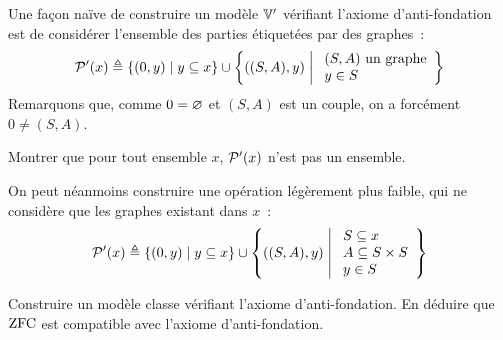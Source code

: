 \begin{problem}
  Une façon naïve de construire un modèle $\mathbb V'$ vérifiant l'axiome
  d'anti-fondation est de considérer l'ensemble des parties étiquetées par des
  graphes~:
  \[\mathcal{P}'(x) \triangleq \left\{ (0,y) \;\middle\vert\; y\subseteq x \right\}\cup
  \left\{ ((S,A),y) \;\middle\vert\; \begin{array}{l} (S,A)\text{ un graphe} \\ y \in S \end{array} \right\}\]
  Remarquons que, comme $0 = \varnothing$ et $(S,A)$ est un couple, on a forcément
  $0 \neq (S,A)$.
  \begin{pbQuest}[resume]
  \item Montrer que pour tout ensemble $x$, $\mathcal{P}'(x)$ n'est pas un
    ensemble.
  \end{pbQuest}
  On peut néanmoins construire une opération légèrement plus faible, qui ne
  considère que les graphes existant dans $x$~:
  \[\mathcal{P}'(x) \triangleq \left\{ (0,y) \;\middle\vert\; y\subseteq x \right\}\cup
  \left\{ ((S,A),y) \;\middle\vert\; \begin{array}{l}
            S\subseteq x\\
            A \subseteq S \times S \\
            y \in S
        \end{array} \right\}
  \]
  \begin{pbQuest}[resume]
  \item Construire un modèle classe vérifiant l'axiome d'anti-fondation. En
    déduire que $\operatorname{ZFC}$ est compatible avec l'axiome d'anti-fondation.
  \end{pbQuest}
\end{problem}
